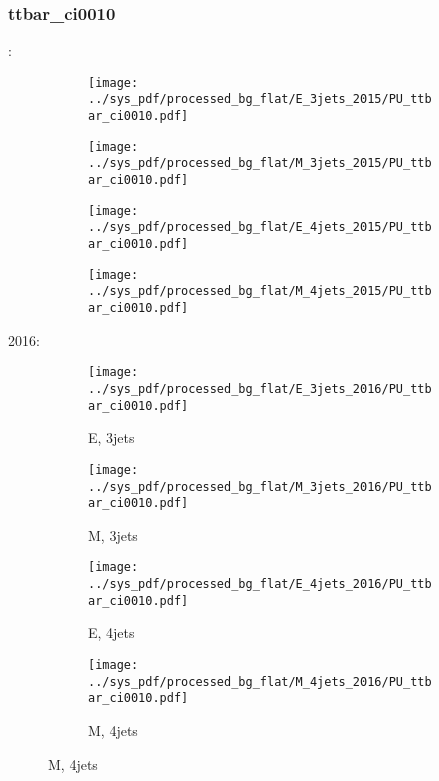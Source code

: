 \documentclass{beamer}
\begin{document}
\begin{frame}
\frametitle{ttbar_ci0010}
\fontsize{5}{1}:
\begin{figure}
\centering
\begin{subfigure}[b]{0.24\textwidth}
\texttt{[image: ../sys\_pdf/processed\_bg\_flat/E\_3jets\_2015/PU\_ttbar\_ci0010.pdf]}
\end{subfigure}
\begin{subfigure}[b]{0.24\textwidth}
\texttt{[image: ../sys\_pdf/processed\_bg\_flat/M\_3jets\_2015/PU\_ttbar\_ci0010.pdf]}
\end{subfigure}
\begin{subfigure}[b]{0.24\textwidth}
\texttt{[image: ../sys\_pdf/processed\_bg\_flat/E\_4jets\_2015/PU\_ttbar\_ci0010.pdf]}
\end{subfigure}
\begin{subfigure}[b]{0.24\textwidth}
\texttt{[image: ../sys\_pdf/processed\_bg\_flat/M\_4jets\_2015/PU\_ttbar\_ci0010.pdf]}
\end{subfigure}
\end{figure}
2016:
\begin{figure}
\centering
\begin{subfigure}[b]{0.24\textwidth}
\texttt{[image: ../sys\_pdf/processed\_bg\_flat/E\_3jets\_2016/PU\_ttbar\_ci0010.pdf]}
\captionsetup{font=tiny}
\caption{E, 3jets}
\end{subfigure}
\begin{subfigure}[b]{0.24\textwidth}
\texttt{[image: ../sys\_pdf/processed\_bg\_flat/M\_3jets\_2016/PU\_ttbar\_ci0010.pdf]}
\captionsetup{font=tiny}
\caption{M, 3jets}
\end{subfigure}
\begin{subfigure}[b]{0.24\textwidth}
\texttt{[image: ../sys\_pdf/processed\_bg\_flat/E\_4jets\_2016/PU\_ttbar\_ci0010.pdf]}
\captionsetup{font=tiny}
\caption{E, 4jets}
\end{subfigure}
\begin{subfigure}[b]{0.24\textwidth}
\texttt{[image: ../sys\_pdf/processed\_bg\_flat/M\_4jets\_2016/PU\_ttbar\_ci0010.pdf]}
\captionsetup{font=tiny}
\caption{M, 4jets}
\end{subfigure}
\end{figure}
\end{frame}
\end{document}
